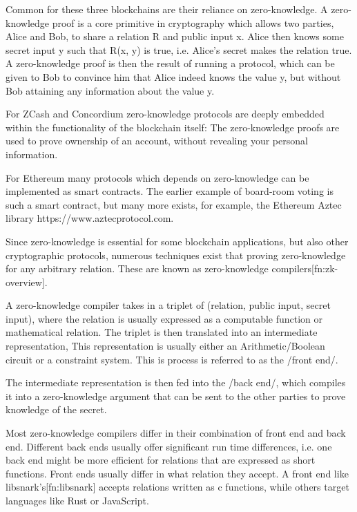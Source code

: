 Common for these three blockchains are their reliance on zero-knowledge.
A zero-knowledge proof is a core primitive in cryptography which
allows two parties, Alice and Bob, to share a relation R and public input x.
Alice then knows some secret input y such that R(x, y) is true, i.e. Alice's
secret makes the relation true.
A zero-knowledge proof is then the result of running a protocol, which can be
given to Bob to convince him that Alice indeed knows the value y, but without Bob
attaining any information about the value y.

For ZCash and Concordium zero-knowledge protocols are deeply embedded within the
functionality of the blockchain itself: The zero-knowledge proofs are used to
prove ownership of an account, without revealing your personal information.

For Ethereum many protocols which depends on zero-knowledge can be implemented
as smart contracts.
The earlier example of board-room voting is such a smart contract, but many more
exists, for example, the Ethereum Aztec library https://www.aztecprotocol.com.

\vspace{3mm}

Since zero-knowledge is essential for some blockchain applications, but also
other cryptographic protocols,
numerous techniques exist that proving zero-knowledge for
any arbitrary relation. These are known as
zero-knowledge compilers[fn:zk-overview].

A zero-knowledge compiler takes in a triplet of (relation, public input, secret
input), where the relation is usually expressed as a computable function or
mathematical relation.
The triplet is then translated into an intermediate representation,
This representation is usually either an Arithmetic/Boolean circuit or a constraint system.
This is process is referred to as the /front end/.

The intermediate representation is then fed into the /back end/, which compiles it
into a zero-knowledge argument that can be sent to the other parties to prove
knowledge of the secret.

Most zero-knowledge compilers differ in their combination of front end and back end.
Different back ends usually offer significant run time differences, i.e. one back
end might be more efficient for relations that are expressed as short functions.
Front ends usually differ in what relation they accept. A front end like
libsnark's[fn:libsnark] accepts relations written as c functions, while others
target languages like Rust or JavaScript.

